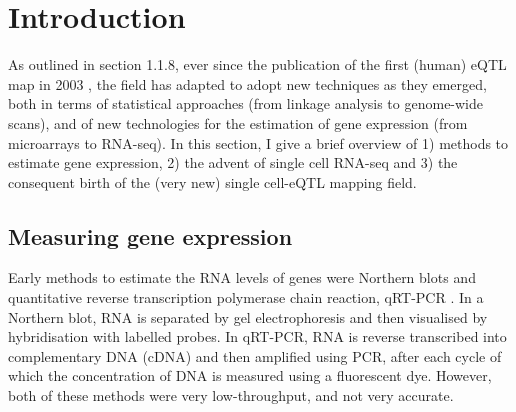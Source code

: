 \newpage



\section{Introduction}

As outlined in section 
1.1.8,
ever since the publication of the first (human) eQTL map in 2003 \cite{schadt2003genetics}, the field has adapted to adopt new techniques as they emerged, both in terms of statistical approaches (from linkage analysis to genome-wide scans), and of new technologies for the estimation of gene expression (from microarrays to RNA-seq).
In this section, I give a brief overview of 1) methods to estimate gene expression, 2) the advent of single cell RNA-seq and 3) the consequent birth of the (very new) single cell-eQTL mapping field. 

\subsection{Measuring gene expression}

Early methods to estimate the RNA levels of genes were Northern blots \cite{alwine1977method} and quantitative reverse transcription polymerase chain reaction, qRT-PCR \cite{gibson1996novel}. 
In a Northern blot, RNA is separated by gel electrophoresis and then visualised by hybridisation with labelled probes. 
In qRT-PCR, RNA is reverse transcribed into complementary DNA (cDNA) and then amplified using PCR, after each cycle of which the concentration of DNA is measured using a fluorescent dye. 
However, both of these methods were very low-throughput, and not very accurate.
\\

